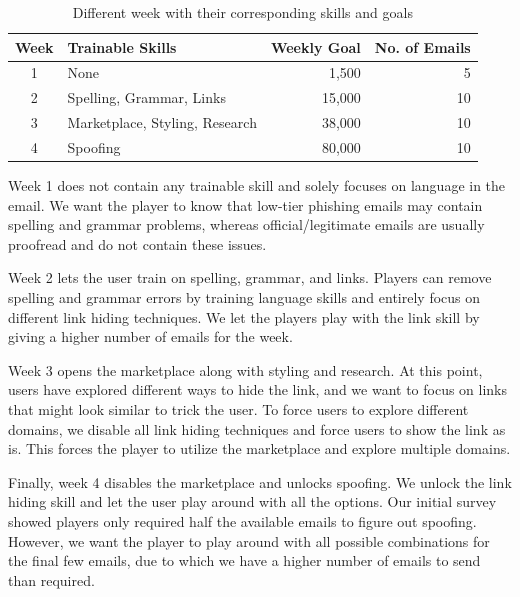 \begin{table}[ht]
    \centering
    \begin{tabular}{c l r r}
        \hline

        \textbf{Week} & \textbf{Trainable Skills}      & \textbf{Weekly Goal} & \textbf{No. of Emails} \\
        \hline
        1             & None                           & 1,500                & 5                      \\
        2             & Spelling, Grammar, Links       & 15,000               & 10                     \\
        3             & Marketplace, Styling, Research & 38,000               & 10                     \\
        4             & Spoofing                       & 80,000               & 10                     \\
        \hline
    \end{tabular}%
    \caption{Different week with their corresponding skills and goals}
    \label{tab:weekly-goals}
\end{table}

Week 1 does not contain any trainable skill and solely focuses on language in the email. We want the player to know that low-tier phishing emails may contain spelling and grammar problems, whereas official/legitimate emails are usually proofread and do not contain these issues.

Week 2 lets the user train on spelling, grammar, and links. Players can remove spelling and grammar errors by training language skills and entirely focus on different link hiding techniques. We let the players play with the link skill by giving a higher number of emails for the week.

Week 3 opens the marketplace along with styling and research. At this point, users have explored different ways to hide the link, and we want to focus on links that might look similar to trick the user. To force users to explore different domains, we disable all link hiding techniques and force users to show the link as is. This forces the player to utilize the marketplace and explore multiple domains.

Finally, week 4 disables the marketplace and unlocks spoofing. We unlock the link hiding skill and let the user play around with all the options. Our initial survey showed players only required half the available emails to figure out spoofing. However, we want the player to play around with all possible combinations for the final few emails, due to which we have a higher number of emails to send than required.